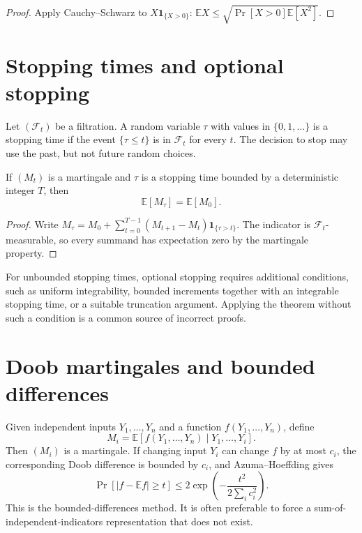 \begin{proof}
Apply Cauchy--Schwarz to $X\mathbf{1}_{\{X>0\}}$:
$\mathbb{E}X\leq\sqrt{\Pr[X>0]\mathbb{E}[X^2]}$.
\end{proof}

\section{Stopping times and optional stopping}

Let $(\mathcal{F}_t)$ be a filtration.  A random variable $\tau$ with values
in $\{0,1,\ldots\}$ is a stopping time if the event $\{\tau\leq t\}$ is in
$\mathcal{F}_t$ for every $t$.  The decision to stop may use the past, but
not future random choices.

\begin{theorem}
If $(M_t)$ is a martingale and $\tau$ is a stopping time bounded by a
deterministic integer $T$, then
\[
 \mathbb{E}[M_\tau]=\mathbb{E}[M_0].
\]
\end{theorem}

\begin{proof}
Write $M_\tau=M_0+\sum_{t=0}^{T-1}(M_{t+1}-M_t)\mathbf{1}_{\{\tau>t\}}$.
The indicator is $\mathcal{F}_t$-measurable, so every summand has expectation
zero by the martingale property.
\end{proof}

For unbounded stopping times, optional stopping requires additional
conditions, such as uniform integrability, bounded increments together with
an integrable stopping time, or a suitable truncation argument.  Applying the
theorem without such a condition is a common source of incorrect proofs.

\section{Doob martingales and bounded differences}

Given independent inputs $Y_1,\ldots,Y_n$ and a function $f(Y_1,\ldots,Y_n)$,
define
\[
 M_i=\mathbb{E}[f(Y_1,\ldots,Y_n)\mid Y_1,\ldots,Y_i].
\]
Then $(M_i)$ is a martingale.  If changing input $Y_i$ can change $f$ by at
most $c_i$, the corresponding Doob difference is bounded by $c_i$, and
Azuma--Hoeffding gives
\[
 \Pr[|f-\mathbb{E}f|\geq t]
 \leq 2\exp\!\left(-\frac{t^2}{2\sum_i c_i^2}\right).
\]
This is the bounded-differences method.  It is often preferable to force a
sum-of-independent-indicators representation that does not exist.

